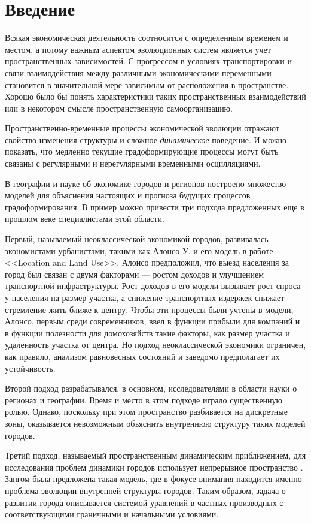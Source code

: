 \chapter*{Введение}
Всякая экономическая деятельность соотносится с определенным временем и местом, а потому важным аспектом эволюционных систем является учет пространственных зависимостей. С прогрессом в условиях транспортировки и связи взаимодействия между различными экономическими переменными становится в значительной мере зависимым от расположения в пространстве. Хорошо было бы понять характеристики таких пространственных взаимодействий или в некотором смысле пространственную самоорганизацию.

Пространственно-временные процессы экономической эволюции отражают свойство изменения структуры и сложное \textit{динамическое} поведение. И можно показать, что медленно текущие градоформирующие процессы могут быть связаны с регулярными и нерегулярными временными осцилляциями.

В географии и науке об экономике городов и регионов построено множество моделей для объяснения настоящих и прогноза будущих процессов градоформирования. В пример можно привести три подхода предложенных еще в прошлом веке специалистами этой области.

Первый, называемый неоклассической экономикой городов, развивалась экономистами-урбанистами, такими как Алонсо У. и его модель в работе <<Location and Land Use>>\cite{alonso}. Алонсо предположил, что выезд населения за город был связан с двумя факторами — ростом доходов и улучшением транспортной инфраструктуры. Рост доходов в его модели вызывает рост спроса у населения на размер участка, а снижение транспортных издержек снижает стремление жить ближе к центру. Чтобы эти процессы были учтены в модели, Алонсо, первым среди современников, ввел в функции прибыли для компаний и в функции полезности для домохозяйств такие факторы, как размер участка и удаленность участка от центра. Но подход неоклассической экономики ограничен, как правило, анализом равновесных состояний и заведомо предполагает их устойчивость.

Второй подход разрабатывался, в основном, исследователями в области науки о регионах и географии. Время и место в этом подходе играло существенную ролью. Однако, поскольку при этом пространство разбивается на дискретные зоны, оказывается невозможным объяснить внутреннюю структуру таких моделей городов.

Третий подход, называемый пространственным динамическим приближением, для исследования проблем динамики городов использует непрерывное пространство \cite[Занг,][]{zhang1991}. Зангом была предложена такая модель, где в фокусе внимания находится именно проблема эволюции внутренней структуры городов. Таким образом, задача о развитии города описывается системой уравнений в частных производных с соответствующими граничными и начальными условиями. 

